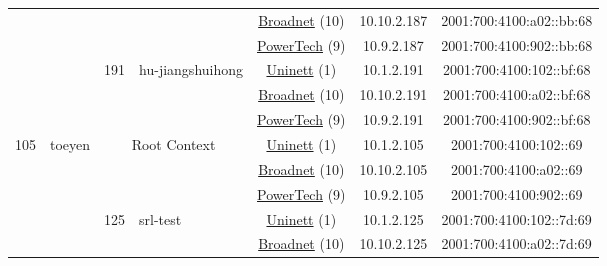 \begin{small}
\begin{center}
\begin{longtable}{|c|c|c|c|c|c|c|c|}
  &  &  &  & \multicolumn{2}{|c|}{\tiny{\href{https://www.broadnet.no}{Broadnet} (10)}} & \tiny{10.10.2.187} & \tiny{2001:700:4100:a02::bb:68} \\* \cline{5-5}\cline{6-6}\cline{7-7}\cline{8-8}
  &  &  &  & \multicolumn{2}{|c|}{\tiny{\href{http://www.powertech.no}{PowerTech} (9)}} & \tiny{10.9.2.187} & \tiny{2001:700:4100:902::bb:68} \\* \cline{3-3}\cline{4-4}\cline{5-5}\cline{6-6}\cline{7-7}\cline{8-8}
  &  & \multirow{3}{*}{\tiny{191}} & \multicolumn{1}{|l|}{\multirow{3}{*}{\tiny{hu-jiangshuihong}}} & \multicolumn{2}{|c|}{\tiny{\href{https://www.uninett.no}{Uninett} (1)}} & \tiny{10.1.2.191} & \tiny{2001:700:4100:102::bf:68} \\* \cline{5-5}\cline{6-6}\cline{7-7}\cline{8-8}
  &  &  &  & \multicolumn{2}{|c|}{\tiny{\href{https://www.broadnet.no}{Broadnet} (10)}} & \tiny{10.10.2.191} & \tiny{2001:700:4100:a02::bf:68} \\* \cline{5-5}\cline{6-6}\cline{7-7}\cline{8-8}
  &  &  &  & \multicolumn{2}{|c|}{\tiny{\href{http://www.powertech.no}{PowerTech} (9)}} & \tiny{10.9.2.191} & \tiny{2001:700:4100:902::bf:68} \\ \hline
 \multirow{33}{*}{\tiny{105}} & \multicolumn{1}{|l|}{\multirow{33}{*}{\tiny{toeyen}}} & \multicolumn{2}{|c|}{\multirow{3}{*}{\tiny{Root Context}}} & \multicolumn{2}{|c|}{\tiny{\href{https://www.uninett.no}{Uninett} (1)}} & \tiny{10.1.2.105} & \tiny{2001:700:4100:102::69} \\* \cline{5-5}\cline{6-6}\cline{7-7}\cline{8-8}
  &  & \multicolumn{2}{|c|}{} & \multicolumn{2}{|c|}{\tiny{\href{https://www.broadnet.no}{Broadnet} (10)}} & \tiny{10.10.2.105} & \tiny{2001:700:4100:a02::69} \\* \cline{5-5}\cline{6-6}\cline{7-7}\cline{8-8}
  &  & \multicolumn{2}{|c|}{} & \multicolumn{2}{|c|}{\tiny{\href{http://www.powertech.no}{PowerTech} (9)}} & \tiny{10.9.2.105} & \tiny{2001:700:4100:902::69} \\* \cline{3-3}\cline{4-4}\cline{5-5}\cline{6-6}\cline{7-7}\cline{8-8}
  &  & \multirow{3}{*}{\tiny{125}} & \multicolumn{1}{|l|}{\multirow{3}{*}{\tiny{srl-test}}} & \multicolumn{2}{|c|}{\tiny{\href{https://www.uninett.no}{Uninett} (1)}} & \tiny{10.1.2.125} & \tiny{2001:700:4100:102::7d:69} \\* \cline{5-5}\cline{6-6}\cline{7-7}\cline{8-8}
  &  &  &  & \multicolumn{2}{|c|}{\tiny{\href{https://www.broadnet.no}{Broadnet} (10)}} & \tiny{10.10.2.125} & \tiny{2001:700:4100:a02::7d:69} \\* \cline{5-5}\cline{6-6}\cline{7-7}\cline{8-8}

\end{longtable}
\end{center}
\end{small}
